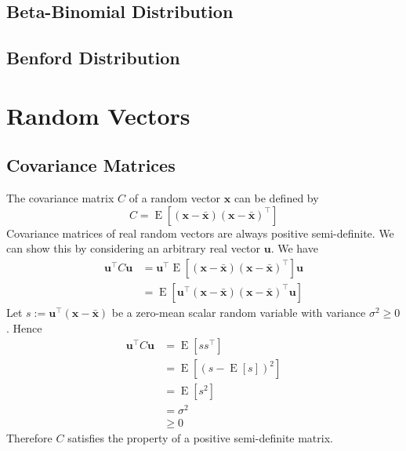 \documentclass[11pt]{report} %
\begin{document}
\subsection{Beta-Binomial Distribution}

\subsection{Benford Distribution}

\section{Random Vectors}

\subsection{Covariance Matrices}
The covariance matrix $C$ of a random vector $\mathbf{x}$ can be defined by
\begin{equation}
C = \operatorname{E}\left[\left(\mathbf{x} - \bar{\mathbf{x}}\right)\left(\mathbf{x} - \bar{\mathbf{x}}\right)^{\top}\right]
\end{equation}
Covariance matrices of real random vectors are always positive semi-definite. We can show this by considering an arbitrary real vector $\mathbf{u}$. We have
\begin{align}
\mathbf{u}^{\top}C\mathbf{u} &= \mathbf{u}^{\top}\operatorname{E}\left[\left(\mathbf{x} - \bar{\mathbf{x}}\right)\left(\mathbf{x} - \bar{\mathbf{x}}\right)^{\top}\right]\mathbf{u} \\
&= \operatorname{E}\left[\mathbf{u}^{\top}\left(\mathbf{x} - \bar{\mathbf{x}}\right)\left(\mathbf{x} - \bar{\mathbf{x}}\right)^{\top}\mathbf{u}\right]
\end{align}
Let $s := \mathbf{u}^{\top}\left(\mathbf{x} - \bar{\mathbf{x}}\right)$ be a zero-mean scalar random variable with variance $\sigma^{2} \geq 0$. Hence
\begin{align}
\mathbf{u}^{\top}C\mathbf{u} &= \operatorname{E}\left[ss^{\top}\right] \\
&= \operatorname{E}\left[\left(s - \operatorname{E}\left[s\right]\right)^{2}\right] \\
&= \operatorname{E}\left[s^{2}\right] \\
&= \sigma^{2} \\
&\geq 0
\end{align}
Therefore $C$ satisfies the property of a positive semi-definite matrix.
\end{document}
